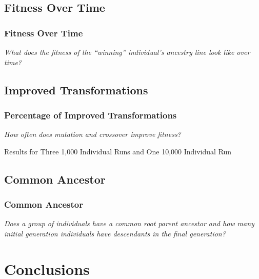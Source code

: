 \documentclass{beamer}
\begin{document}
\subsection[Fitness Graph]{Fitness Over Time}

\begin{frame}
\frametitle{Fitness Over Time}
\emph{What does the fitness of the ``winning'' individual's ancestry line look like over time?}
\begin{center}
\end{center}
\end{frame}

\subsection[Improved Transformations]{Improved Transformations}

\begin{frame}
\frametitle{Percentage of Improved Transformations}
\emph{How often does mutation and crossover improve fitness?}
\begin{center}
{\tiny Results for Three 1,000 Individual Runs and One 10,000 Individual Run}
\end{center}
\end{frame}

\subsection[Common Ancestor]{Common Ancestor}

\begin{frame}
\frametitle{Common Ancestor}
\emph{Does a group of individuals have a common root parent ancestor and how many initial generation individuals have descendants in the final generation?}
\begin{center}
\end{center}

\end{frame}

\section[Conclusions]{Conclusions}
\end{document}
